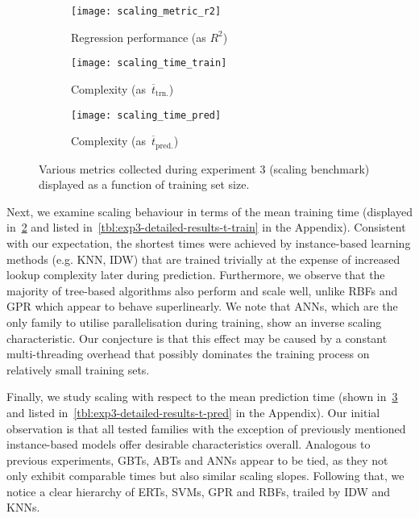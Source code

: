 \begin{figure}[h]
	\centering
	\begin{subfigure}[b]{0.333\textwidth}
		\centering
		\texttt{[image: scaling\_metric\_r2]}
		\caption{Regression performance (as $R^2$)}
		\label{fig:scaling-r2}
	\end{subfigure}\hfill%
	\begin{subfigure}[b]{0.333\textwidth}
		\centering
		\texttt{[image: scaling\_time\_train]}
		\caption{Complexity (as~$\overline{t}_{\text{trn.}}$)}
		\label{fig:scaling-trn}
	\end{subfigure}\hfill%
	\begin{subfigure}[b]{0.333\textwidth}
		\centering
		\texttt{[image: scaling\_time\_pred]}
		\caption{Complexity (as~$\overline{t}_{\text{pred.}}$)}
		\label{fig:scaling-pred}
	\end{subfigure}
	\caption{Various metrics collected during experiment 3 (scaling
	benchmark) displayed as a function of training set size.}
	\label{fig:scaling}
\end{figure}

Next, we examine scaling behaviour in terms of the mean training time (displayed
in~\cref{fig:scaling-trn} and listed in~\cref{tbl:exp3-detailed-results-t-train} in
the Appendix). Consistent with our expectation, the shortest times
were achieved by instance-based learning methods (e.g. KNN, IDW) that
are trained trivially at the expense of increased lookup complexity later during prediction.
Furthermore, we observe that the majority of tree-based algorithms also perform
and scale well, unlike RBFs and GPR which appear to behave superlinearly. We note that ANNs,
which are the only family to utilise parallelisation during training, show an
inverse scaling characteristic. Our conjecture is that this effect may be caused
by a constant multi-threading overhead that possibly dominates the training process
on relatively small training sets.

Finally, we study scaling with respect to the mean prediction time (shown
in~\cref{fig:scaling-pred} and listed in~\cref{tbl:exp3-detailed-results-t-pred} in
the Appendix). Our initial observation is that all tested
families with the exception of previously mentioned instance-based
models offer desirable characteristics overall. Analogous to previous
experiments, GBTs, ABTs and ANNs appear to be tied, as they not only exhibit
comparable times but also similar scaling slopes. Following that, we notice a
clear hierarchy of ERTs, SVMs, GPR and RBFs, trailed by IDW and KNNs.


